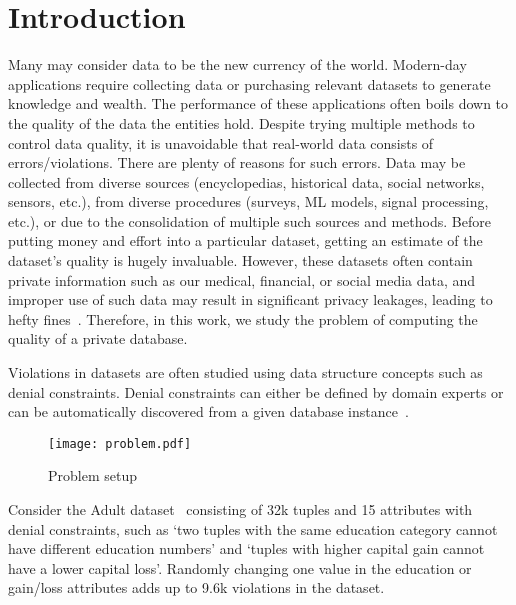 
\section{Introduction}\label{sec:intro}

Many may consider data to be the new currency of the world. Modern-day applications require collecting data or purchasing relevant datasets to generate knowledge and wealth. The performance of these applications often boils down to the quality of the data the entities hold. Despite trying multiple methods to control data quality, it is unavoidable that real-world data consists of errors/violations. There are plenty of reasons for such errors. Data may be collected from diverse sources (encyclopedias, historical data, social networks, sensors, etc.), from diverse procedures (surveys, ML models, signal processing, etc.), or due to the consolidation of multiple such sources and methods. Before putting money and effort into a particular dataset, getting an estimate of the dataset's quality is hugely invaluable. However, these datasets often contain private information such as our medical, financial, or social media data, and improper use of such data may result in significant privacy leakages, leading to hefty fines~\cite{GDPR}. Therefore, in this work, we study the problem of computing the quality of a private database. 

Violations in datasets are often studied using data structure concepts such as denial constraints. Denial constraints can either be defined by domain experts or can be automatically discovered from a given database instance~\cite{bleifuss2017efficient, chu2013discovering}.  

\begin{figure}[t]
\texttt{[image: problem.pdf]}
\caption{Problem setup}
\end{figure}    

\begin{example}
    Consider the Adult dataset~\cite{misc_adult_2} consisting of 32k tuples and 15 attributes with denial constraints, such as ‘two tuples with the same education category cannot have different education numbers’ and ‘tuples with higher capital gain cannot have a lower capital loss’. Randomly changing one value in the education or gain/loss attributes adds up to 9.6k violations in the dataset. 
\end{example}

